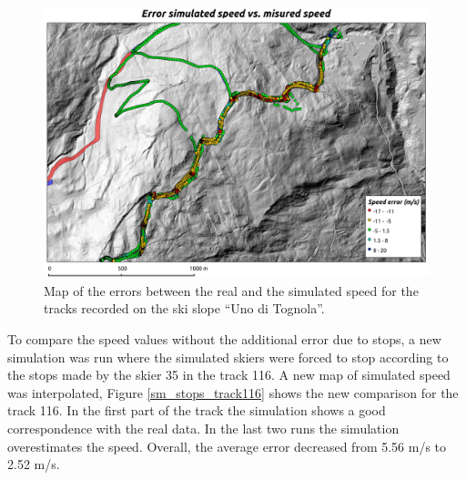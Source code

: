 \documentclass[12pt,a4paper,twoside]{book}
\begin{document}
\begin{figure}[!h]
  \centering
    \includegraphics[width=\textwidth]{images/map_error.eps}
    \caption{Map of the errors between the real and the simulated speed for the tracks recorded on the ski slope ``Uno di Tognola''.}\label{map_error}
\end{figure}

To compare the speed values without the additional error due to stops, a new simulation was run where the simulated skiers were forced to stop according to the stops made by the skier 35 in the track 116. A new map of simulated speed was interpolated, Figure \ref{sm_stops_track116} shows the new comparison for the track 116. In the first part of the track the simulation shows a good correspondence with the real data. In the last two runs the simulation overestimates the speed. Overall, the average error decreased from 5.56 m/s to 2.52 m/s.
\end{document}
